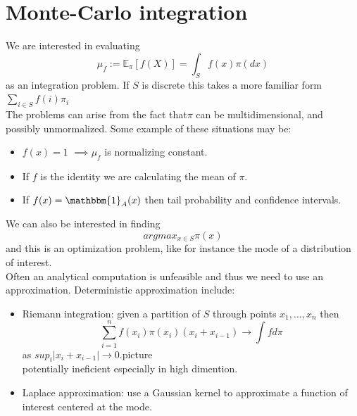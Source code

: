 \documentclass{article}
\begin{document}
\begin{figure}[H]
    \centering
    \label{dperiod}
\end{figure}
\section{Monte-Carlo integration}
We are interested in evaluating 
\begin{equation*}
    \mu_f := \mathbb{E}_{\pi}  [f(X)] = \int_S f(x) \pi(dx)
\end{equation*}
as an integration problem.
If $S$ is discrete this takes a more familiar form $\sum_{i \in S}f(i)\pi_i$ \\
The problems can arise from the fact that$\pi$ can be multidimensional, and possibly unmormalized. Some example of these situations may be:
\begin{itemize}
    \item $f(x) = 1$ $\implies \mu_f$ is normalizing constant.
    \item If $f$ is the identity we are calculating the mean of $\pi$.
    \item If $f(x) = \mathbbm{1}_A(x) $ then tail probability and confidence intervals. 
\end{itemize}
We can also be interested in finding 
\begin{equation*}
    argmax_{x \in S} \pi (x) 
\end{equation*}
and this is an optimization problem, like for instance the mode of a distribution of interest. \\
Often an analytical computation is unfeasible and thus we need to use an approximation. Deterministic approximation include:
\begin{itemize}
    \item Riemann integration: given a partition of $S$ through points  $x_1, \dots, x_n$ then 
    \begin{equation*}
        \sum_{i=1}^n f(x_i) \pi (x_i) (x_i+x_{i-1}) \rightarrow \int f d\pi
    \end{equation*}
    as $sup_i |x_i+x_{i-1}| \rightarrow 0$.picture \\
    potentially ineficient especially in high dimention.
    \item Laplace approximation: use a Gaussian kernel to approximate a function of interest centered at the mode.
    \end{itemize}
\end{document}
